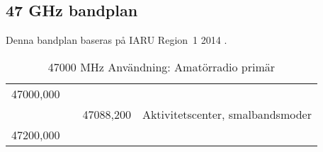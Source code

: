 \subsection{47 GHz bandplan}
\label{47GHzbandplan}
Denna bandplan baseras på IARU Region~1 2014 \cite{IARU1}.

\begin{table}[h]
  \caption{47000 MHz Användning: Amatörradio primär}
  \begin{xtabular}{llll}
47000,000 & & & \\
          & & 47088,200 & Aktivitetscenter, smalbandsmoder \\
47200,000 & & & \\
\end{xtabular}
\end{table}

\twocolumn
